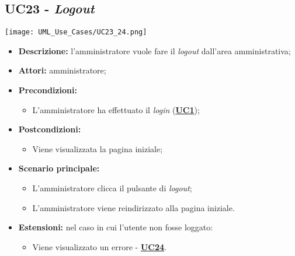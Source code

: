 \subsection{UC23 - \textit{Logout}}
\label{sec:UC23}
\texttt{[image: UML\_Use\_Cases/UC23\_24.png]}
\begin{itemize}
	\item \textbf{Descrizione:} l'amministratore vuole fare il \textit{logout} dall'area amministrativa; 
	\item \textbf{Attori:} amministratore;
	\item \textbf{Precondizioni:} 
	\begin{itemize}
		\item L’amministratore ha effettuato il \textit{login} (\hyperref[sec:UC1]{\textbf{UC1}});
	\end{itemize}
	\item \textbf{Postcondizioni:} 
	\begin{itemize}
		\item Viene visualizzata la pagina iniziale;
	\end{itemize}
	\item \textbf{Scenario principale:} 
	\begin{itemize}
		\item L’amministratore clicca il pulsante di \textit{logout};
		\item L’amministratore viene reindirizzato alla pagina iniziale.
	\end{itemize}
	\item \textbf{Estensioni:} nel caso in cui l'utente non fosse loggato:
	\begin{itemize}
		\item Viene visualizzato un errore - \hyperref[sec:UC24]{\textbf{UC24}}.
	\end{itemize}
\end{itemize}

